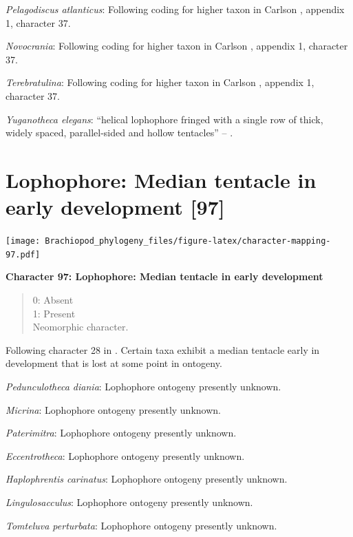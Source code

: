 \documentclass[]{book}
\theoremstyle{definition}
\theoremstyle{definition}
\theoremstyle{definition}
\theoremstyle{remark}
\begin{document}
\emph{Pelagodiscus atlanticus}: Following coding for higher taxon in
Carlson \citeyearpar{Carlson1995Phylogeneticrelationships}, appendix 1,
character 37.

\emph{Novocrania}: Following coding for higher taxon in Carlson
\citeyearpar{Carlson1995Phylogeneticrelationships}, appendix 1,
character 37.

\emph{Terebratulina}: Following coding for higher taxon in Carlson
\citeyearpar{Carlson1995Phylogeneticrelationships}, appendix 1,
character 37.

\emph{Yuganotheca elegans}: ``helical lophophore fringed with a single
row of thick, widely spaced, parallel-sided and hollow tentacles'' --
\citet{Zhang2014Anearly}.

\hypertarget{lophophore-median-tentacle-in-early-development-97}{%
\section{Lophophore: Median tentacle in early development
{[}97{]}}\label{lophophore-median-tentacle-in-early-development-97}}

\texttt{[image: Brachiopod\_phylogeny\_files/figure-latex/character-mapping-97.pdf]}

\textbf{Character 97: Lophophore: Median tentacle in early development}

\begin{quote}
0: Absent\\
1: Present\\
Neomorphic character.
\end{quote}

Following character 28 in \citet{Carlson1995Phylogeneticrelationships}.
Certain taxa exhibit a median tentacle early in development that is lost
at some point in ontogeny.

\emph{Pedunculotheca diania}: Lophophore ontogeny presently unknown.

\emph{Micrina}: Lophophore ontogeny presently unknown.

\emph{Paterimitra}: Lophophore ontogeny presently unknown.

\emph{Eccentrotheca}: Lophophore ontogeny presently unknown.

\emph{Haplophrentis carinatus}: Lophophore ontogeny presently unknown.

\emph{Lingulosacculus}: Lophophore ontogeny presently unknown.

\emph{Tomteluva perturbata}: Lophophore ontogeny presently unknown.
\end{document}
